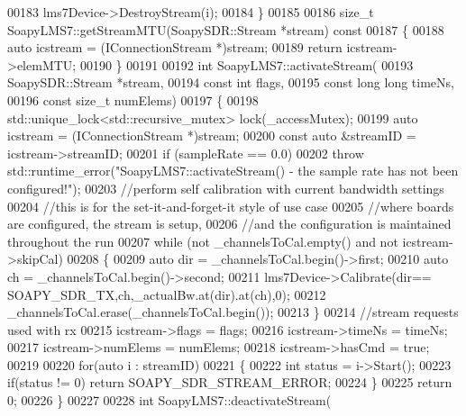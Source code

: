 \begin{DoxyCode}
00183         lms7Device->DestroyStream(i);
00184 \}
00185 
00186 \textcolor{keywordtype}{size\_t} SoapyLMS7::getStreamMTU(SoapySDR::Stream *stream)\textcolor{keyword}{ const}
00187 \textcolor{keyword}{}\{
00188     \textcolor{keyword}{auto} icstream = (IConnectionStream *)stream;
00189     \textcolor{keywordflow}{return} icstream->elemMTU;
00190 \}
00191 
00192 \textcolor{keywordtype}{int} SoapyLMS7::activateStream(
00193     SoapySDR::Stream *stream,
00194     \textcolor{keyword}{const} \textcolor{keywordtype}{int} flags,
00195     \textcolor{keyword}{const} \textcolor{keywordtype}{long} \textcolor{keywordtype}{long} timeNs,
00196     \textcolor{keyword}{const} \textcolor{keywordtype}{size\_t} numElems)
00197 \{
00198     std::unique\_lock<std::recursive\_mutex> lock(\_accessMutex);
00199     \textcolor{keyword}{auto} icstream = (IConnectionStream *)stream;
00200     \textcolor{keyword}{const} \textcolor{keyword}{auto} &streamID = icstream->streamID;
00201     \textcolor{keywordflow}{if} (sampleRate == 0.0)
00202         \textcolor{keywordflow}{throw} std::runtime\_error(\textcolor{stringliteral}{"SoapyLMS7::activateStream() - the sample rate has not been configured!"});
00203     \textcolor{comment}{//perform self calibration with current bandwidth settings}
00204     \textcolor{comment}{//this is for the set-it-and-forget-it style of use case}
00205     \textcolor{comment}{//where boards are configured, the stream is setup,}
00206     \textcolor{comment}{//and the configuration is maintained throughout the run}
00207     \textcolor{keywordflow}{while} (not \_channelsToCal.empty() and not icstream->skipCal)
00208     \{
00209         \textcolor{keyword}{auto} dir  = \_channelsToCal.begin()->first;
00210         \textcolor{keyword}{auto} ch  = \_channelsToCal.begin()->second;
00211         lms7Device->Calibrate(dir== SOAPY_SDR_TX,ch,\_actualBw.at(dir).at(ch),0);
00212         \_channelsToCal.erase(\_channelsToCal.begin());
00213     \}
00214     \textcolor{comment}{//stream requests used with rx}
00215     icstream->flags = flags;
00216     icstream->timeNs = timeNs;
00217     icstream->numElems = numElems;
00218     icstream->hasCmd = \textcolor{keyword}{true};
00219 
00220     \textcolor{keywordflow}{for}(\textcolor{keyword}{auto} i : streamID)
00221     \{
00222         \textcolor{keywordtype}{int} status = i->Start();
00223         \textcolor{keywordflow}{if}(status != 0) \textcolor{keywordflow}{return} SOAPY_SDR_STREAM_ERROR;
00224     \}
00225     \textcolor{keywordflow}{return} 0;
00226 \}
00227 
00228 \textcolor{keywordtype}{int} SoapyLMS7::deactivateStream(

\end{DoxyCode}
